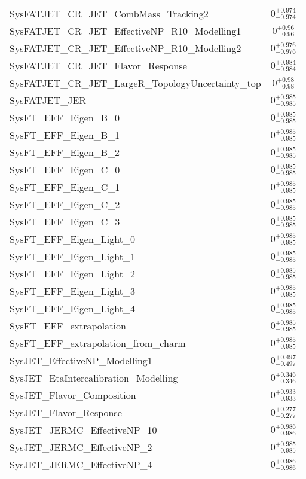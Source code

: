 \begin{tabular}{|l|c|}
SysFATJET\_CR\_JET\_CombMass\_Tracking2 & $0^{+0.974}_{-0.974}$ \\
SysFATJET\_CR\_JET\_EffectiveNP\_R10\_Modelling1 & $0^{+0.96}_{-0.96}$ \\
SysFATJET\_CR\_JET\_EffectiveNP\_R10\_Modelling2 & $0^{+0.976}_{-0.976}$ \\
SysFATJET\_CR\_JET\_Flavor\_Response & $0^{+0.984}_{-0.984}$ \\
SysFATJET\_CR\_JET\_LargeR\_TopologyUncertainty\_top & $0^{+0.98}_{-0.98}$ \\
SysFATJET\_JER & $0^{+0.985}_{-0.985}$ \\
SysFT\_EFF\_Eigen\_B\_0 & $0^{+0.985}_{-0.985}$ \\
SysFT\_EFF\_Eigen\_B\_1 & $0^{+0.985}_{-0.985}$ \\
SysFT\_EFF\_Eigen\_B\_2 & $0^{+0.985}_{-0.985}$ \\
SysFT\_EFF\_Eigen\_C\_0 & $0^{+0.985}_{-0.985}$ \\
SysFT\_EFF\_Eigen\_C\_1 & $0^{+0.985}_{-0.985}$ \\
SysFT\_EFF\_Eigen\_C\_2 & $0^{+0.985}_{-0.985}$ \\
SysFT\_EFF\_Eigen\_C\_3 & $0^{+0.985}_{-0.985}$ \\
SysFT\_EFF\_Eigen\_Light\_0 & $0^{+0.985}_{-0.985}$ \\
SysFT\_EFF\_Eigen\_Light\_1 & $0^{+0.985}_{-0.985}$ \\
SysFT\_EFF\_Eigen\_Light\_2 & $0^{+0.985}_{-0.985}$ \\
SysFT\_EFF\_Eigen\_Light\_3 & $0^{+0.985}_{-0.985}$ \\
SysFT\_EFF\_Eigen\_Light\_4 & $0^{+0.985}_{-0.985}$ \\
SysFT\_EFF\_extrapolation & $0^{+0.985}_{-0.985}$ \\
SysFT\_EFF\_extrapolation\_from\_charm & $0^{+0.985}_{-0.985}$ \\
SysJET\_EffectiveNP\_Modelling1 & $0^{+0.497}_{-0.497}$ \\
SysJET\_EtaIntercalibration\_Modelling & $0^{+0.346}_{-0.346}$ \\
SysJET\_Flavor\_Composition & $0^{+0.933}_{-0.933}$ \\
SysJET\_Flavor\_Response & $0^{+0.277}_{-0.277}$ \\
SysJET\_JERMC\_EffectiveNP\_10 & $0^{+0.986}_{-0.986}$ \\
SysJET\_JERMC\_EffectiveNP\_2 & $0^{+0.985}_{-0.985}$ \\
SysJET\_JERMC\_EffectiveNP\_4 & $0^{+0.986}_{-0.986}$ \\

\end{tabular}
